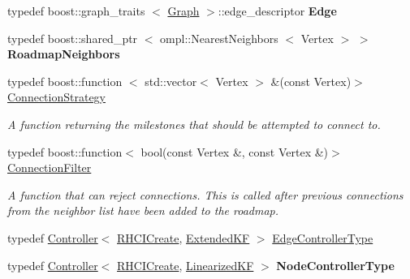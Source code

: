 \begin{DoxyCompactItemize}
\item 
\hypertarget{class_f_i_r_m_a88889998bf429572821d467eb44c67c6}{typedef boost\-::graph\-\_\-traits\*
$<$ \hyperlink{class_f_i_r_m_a687e9f4243b22c30ee1fa5da22a85053}{\-Graph} $>$\-::edge\-\_\-descriptor {\bfseries \-Edge}}\label{class_f_i_r_m_a88889998bf429572821d467eb44c67c6}

\item 
\hypertarget{class_f_i_r_m_a687705deb489cff3a2d40b7bec6bdc29}{typedef boost\-::shared\-\_\-ptr\*
$<$ ompl\-::\-Nearest\-Neighbors\*
$<$ \-Vertex $>$ $>$ {\bfseries \-Roadmap\-Neighbors}}\label{class_f_i_r_m_a687705deb489cff3a2d40b7bec6bdc29}

\item 
\hypertarget{class_f_i_r_m_a15cfbcaf52c0bdd5e6c1a969bbf7ea1e}{typedef boost\-::function\*
$<$ std\-::vector$<$ \-Vertex $>$\*
 \&(const \-Vertex)$>$ \hyperlink{class_f_i_r_m_a15cfbcaf52c0bdd5e6c1a969bbf7ea1e}{\-Connection\-Strategy}}\label{class_f_i_r_m_a15cfbcaf52c0bdd5e6c1a969bbf7ea1e}

\begin{DoxyCompactList}\small\item\em \-A function returning the milestones that should be attempted to connect to. \end{DoxyCompactList}\item 
\hypertarget{class_f_i_r_m_a2482eee2e5248d5bff3b3b56e5a593b3}{typedef boost\-::function$<$ bool(const \*
\-Vertex \&, const \-Vertex \&)$>$ \hyperlink{class_f_i_r_m_a2482eee2e5248d5bff3b3b56e5a593b3}{\-Connection\-Filter}}\label{class_f_i_r_m_a2482eee2e5248d5bff3b3b56e5a593b3}

\begin{DoxyCompactList}\small\item\em \-A function that can reject connections. \-This is called after previous connections from the neighbor list have been added to the roadmap. \end{DoxyCompactList}\item 
typedef \hyperlink{class_controller}{\-Controller}$<$ \hyperlink{class_r_h_c_i_create}{\-R\-H\-C\-I\-Create}, \*
\hyperlink{class_extended_k_f}{\-Extended\-K\-F} $>$ \hyperlink{class_f_i_r_m_a70abcb24fbc9f836b94119f65c8f8a37}{\-Edge\-Controller\-Type}
\item 
\hypertarget{class_f_i_r_m_adf37596ffd4dbf633d7cd0f27347d15c}{typedef \hyperlink{class_controller}{\-Controller}$<$ \hyperlink{class_r_h_c_i_create}{\-R\-H\-C\-I\-Create}, \*
\hyperlink{class_linearized_k_f}{\-Linearized\-K\-F} $>$ {\bfseries \-Node\-Controller\-Type}}\label{class_f_i_r_m_adf37596ffd4dbf633d7cd0f27347d15c}


\end{DoxyCompactItemize}
